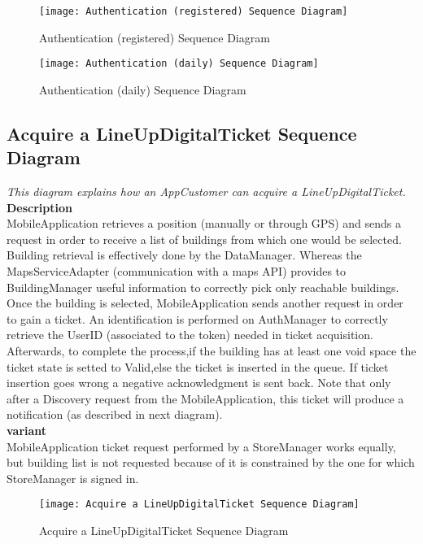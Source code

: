 \begin{figure}[H]
 \centering
 \texttt{[image: Authentication (registered) Sequence Diagram]}
 \caption{ Authentication (registered) Sequence Diagram}
 \end{figure}

\begin{figure}[H]
 \centering
 \texttt{[image: Authentication (daily) Sequence Diagram]}
 \caption{Authentication (daily) Sequence Diagram}
 \end{figure}

\newpage
\subsection{ Acquire a LineUpDigitalTicket Sequence Diagram}
\textit{This diagram explains how an AppCustomer can acquire a LineUpDigitalTicket.\\}
\textbf{Description\\}
MobileApplication retrieves a position (manually or through GPS) and sends a request in order to receive a list of buildings from which one would be selected. Building retrieval is effectively done by the DataManager. Whereas the MapsServiceAdapter (communication with a maps API) provides to BuildingManager useful information to correctly pick only reachable buildings.
Once the building is selected, MobileApplication sends another request in order to gain a ticket. An identification is performed on AuthManager to correctly retrieve the UserID (associated to the token) needed in ticket acquisition. Afterwards, to complete the process,if the building has at least one void space the ticket state is setted to Valid,else the ticket is inserted in the queue.
If ticket insertion goes wrong a negative acknowledgment is sent back.
Note that only after a Discovery request from the MobileApplication, this ticket will produce a notification (as described in next diagram).\\
\textbf{variant\\}
MobileApplication ticket request performed by a StoreManager works equally, but building list is not requested because of it is constrained by the one for which StoreManager is signed in. \\

\begin{figure}[H]
 \centering
 \texttt{[image: Acquire a LineUpDigitalTicket Sequence Diagram]}
 \caption{ Acquire a LineUpDigitalTicket Sequence Diagram}
 \end{figure}


